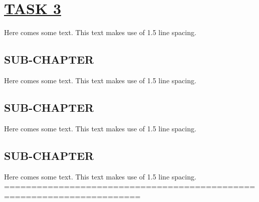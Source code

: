 \documentclass[fontsize=11pt]{scrartcl}
\begin{document}
\section{\uline{TASK 3}}
Here comes some text. This text makes use of 1.5 line spacing. 
\subsection{SUB-CHAPTER}
Here comes some text. This text makes use of 1.5 line spacing. 
\subsection{SUB-CHAPTER}
Here comes some text. This text makes use of 1.5 line spacing. 
\subsection{SUB-CHAPTER}
Here comes some text. This text makes use of 1.5 line spacing. 
\pagebreak
=======================================================================
\end{document}
